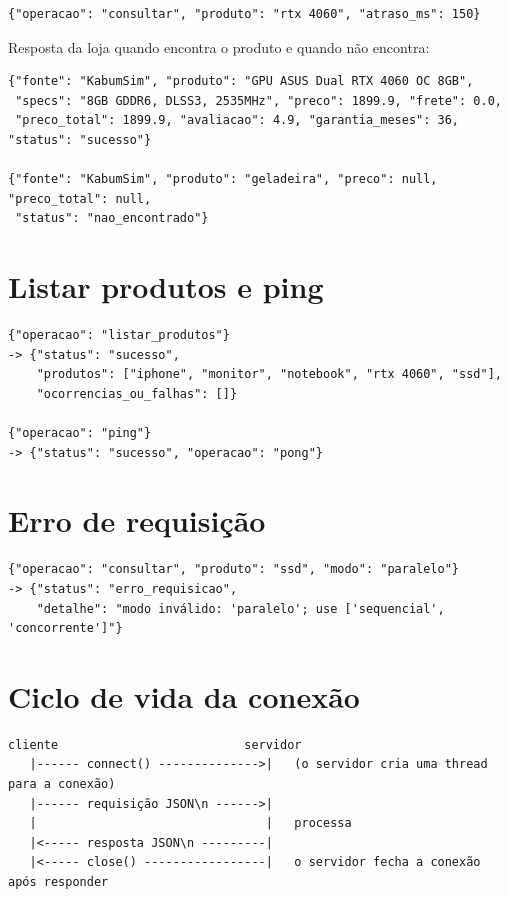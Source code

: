 \begin{apendicesenv}
\begin{lstlisting}[style=json]
{"operacao": "consultar", "produto": "rtx 4060", "atraso_ms": 150}
\end{lstlisting}

Resposta da loja quando encontra o produto e quando não encontra:

\begin{lstlisting}[style=json]
{"fonte": "KabumSim", "produto": "GPU ASUS Dual RTX 4060 OC 8GB",
 "specs": "8GB GDDR6, DLSS3, 2535MHz", "preco": 1899.9, "frete": 0.0,
 "preco_total": 1899.9, "avaliacao": 4.9, "garantia_meses": 36, "status": "sucesso"}

{"fonte": "KabumSim", "produto": "geladeira", "preco": null, "preco_total": null,
 "status": "nao_encontrado"}
\end{lstlisting}

\section{Listar produtos e ping}

\begin{lstlisting}[style=json]
{"operacao": "listar_produtos"}
-> {"status": "sucesso",
    "produtos": ["iphone", "monitor", "notebook", "rtx 4060", "ssd"],
    "ocorrencias_ou_falhas": []}

{"operacao": "ping"}
-> {"status": "sucesso", "operacao": "pong"}
\end{lstlisting}

\section{Erro de requisição}

\begin{lstlisting}[style=json]
{"operacao": "consultar", "produto": "ssd", "modo": "paralelo"}
-> {"status": "erro_requisicao",
    "detalhe": "modo inválido: 'paralelo'; use ['sequencial', 'concorrente']"}
\end{lstlisting}

\section{Ciclo de vida da conexão}

\begin{lstlisting}[style=json]
cliente                          servidor
   |------ connect() -------------->|   (o servidor cria uma thread para a conexão)
   |------ requisição JSON\n ------>|
   |                                |   processa
   |<----- resposta JSON\n ---------|
   |<----- close() -----------------|   o servidor fecha a conexão após responder
\end{lstlisting}

\end{apendicesenv}



